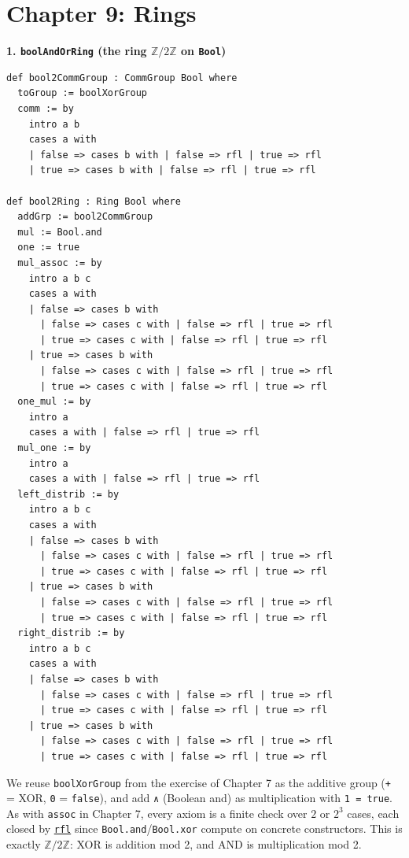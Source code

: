 \section{Chapter 9: Rings}\label{sec:15-appendix-solutions:08-chapter-9:1}

\textbf{1. \texttt{boolAndOrRing} (the ring \(\mathbb{Z}/2\mathbb{Z}\) on \texttt{Bool})}

\begin{lstlisting}
def bool2CommGroup : CommGroup Bool where
  toGroup := boolXorGroup
  comm := by
    intro a b
    cases a with
    | false => cases b with | false => rfl | true => rfl
    | true => cases b with | false => rfl | true => rfl

def bool2Ring : Ring Bool where
  addGrp := bool2CommGroup
  mul := Bool.and
  one := true
  mul_assoc := by
    intro a b c
    cases a with
    | false => cases b with
      | false => cases c with | false => rfl | true => rfl
      | true => cases c with | false => rfl | true => rfl
    | true => cases b with
      | false => cases c with | false => rfl | true => rfl
      | true => cases c with | false => rfl | true => rfl
  one_mul := by
    intro a
    cases a with | false => rfl | true => rfl
  mul_one := by
    intro a
    cases a with | false => rfl | true => rfl
  left_distrib := by
    intro a b c
    cases a with
    | false => cases b with
      | false => cases c with | false => rfl | true => rfl
      | true => cases c with | false => rfl | true => rfl
    | true => cases b with
      | false => cases c with | false => rfl | true => rfl
      | true => cases c with | false => rfl | true => rfl
  right_distrib := by
    intro a b c
    cases a with
    | false => cases b with
      | false => cases c with | false => rfl | true => rfl
      | true => cases c with | false => rfl | true => rfl
    | true => cases b with
      | false => cases c with | false => rfl | true => rfl
      | true => cases c with | false => rfl | true => rfl
\end{lstlisting}

We reuse \texttt{boolXorGroup} from the exercise of Chapter 7 as the additive group (\texttt{+} = XOR, \texttt{0} = \texttt{false}), and add \texttt{∧} (Boolean and) as multiplication with \texttt{1 = true}. As with \texttt{assoc} in Chapter 7, every axiom is a finite check over \(2\) or \(2^3\) cases, each closed by \href{https://lean-lang.org/doc/reference/latest/Tactic-Proofs/Tactic-Reference/}{\texttt{rfl}} since \texttt{Bool.and}/\texttt{Bool.xor} compute on concrete constructors. This is exactly \(\mathbb{Z}/2\mathbb{Z}\): XOR is addition mod 2, and AND is multiplication mod 2.

